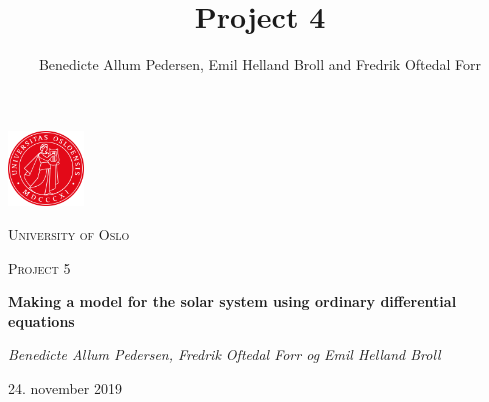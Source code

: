 \documentclass{article}
\title{Project 4}\vspace{-3ex}
\author{Benedicte Allum Pedersen, Emil Helland Broll and Fredrik Oftedal Forr}
\date{\vspace{-5ex}}
\begin{document}
\begin{titlepage}
  \centering
  \includegraphics[width=0.15\textwidth]{./pics/uio.png}\par\vspace{1cm}
  {\scshape\LARGE University of Oslo\par}
  \vspace{1cm}
  {\scshape\Large Project 5\par}
  \vspace{1.5cm}
  {\huge\bfseries Making a model for the solar system using ordinary differential equations\par}
  \vspace{2cm}
  {\Large\itshape Benedicte Allum Pedersen, Fredrik Oftedal Forr og Emil Helland Broll\par}
	\vfill

  \vfill
  {\large 24. november 2019\par}
\end{titlepage}
\end{document}
